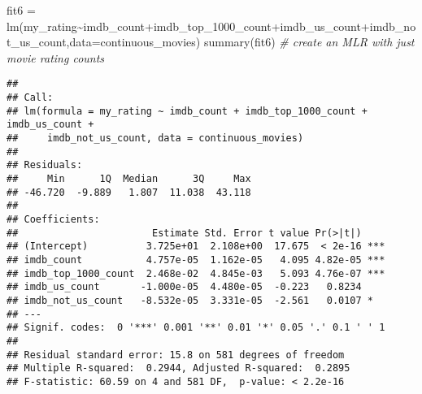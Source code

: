 \documentclass[
]{article}
\newenvironment{Shaded}{\begin{snugshade}}{\end{snugshade}}
\newcommand{\AttributeTok}[1]{\textcolor[rgb]{0.77,0.63,0.00}{#1}}
\newcommand{\CommentTok}[1]{\textcolor[rgb]{0.56,0.35,0.01}{\textit{#1}}}
\newcommand{\FunctionTok}[1]{\textcolor[rgb]{0.00,0.00,0.00}{#1}}
\newcommand{\NormalTok}[1]{#1}
\newcommand{\OtherTok}[1]{\textcolor[rgb]{0.56,0.35,0.01}{#1}}
\newcommand{\SpecialCharTok}[1]{\textcolor[rgb]{0.00,0.00,0.00}{#1}}
\begin{document}
\begin{Shaded}
\begin{Highlighting}[]
\NormalTok{fit6 }\OtherTok{=} \FunctionTok{lm}\NormalTok{(my\_rating}\SpecialCharTok{\textasciitilde{}}\NormalTok{imdb\_count}\SpecialCharTok{+}\NormalTok{imdb\_top\_1000\_count}\SpecialCharTok{+}\NormalTok{imdb\_us\_count}\SpecialCharTok{+}\NormalTok{imdb\_not\_us\_count,}\AttributeTok{data=}\NormalTok{continuous\_movies)}
\FunctionTok{summary}\NormalTok{(fit6) }\CommentTok{\# create an MLR with just movie rating counts}
\end{Highlighting}
\end{Shaded}

\begin{verbatim}
## 
## Call:
## lm(formula = my_rating ~ imdb_count + imdb_top_1000_count + imdb_us_count + 
##     imdb_not_us_count, data = continuous_movies)
## 
## Residuals:
##     Min      1Q  Median      3Q     Max 
## -46.720  -9.889   1.807  11.038  43.118 
## 
## Coefficients:
##                       Estimate Std. Error t value Pr(>|t|)    
## (Intercept)          3.725e+01  2.108e+00  17.675  < 2e-16 ***
## imdb_count           4.757e-05  1.162e-05   4.095 4.82e-05 ***
## imdb_top_1000_count  2.468e-02  4.845e-03   5.093 4.76e-07 ***
## imdb_us_count       -1.000e-05  4.480e-05  -0.223   0.8234    
## imdb_not_us_count   -8.532e-05  3.331e-05  -2.561   0.0107 *  
## ---
## Signif. codes:  0 '***' 0.001 '**' 0.01 '*' 0.05 '.' 0.1 ' ' 1
## 
## Residual standard error: 15.8 on 581 degrees of freedom
## Multiple R-squared:  0.2944, Adjusted R-squared:  0.2895 
## F-statistic: 60.59 on 4 and 581 DF,  p-value: < 2.2e-16
\end{verbatim}
\end{document}
